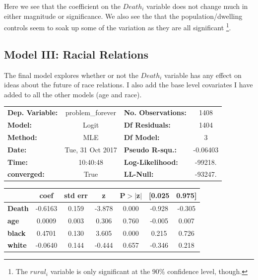 \documentclass{article}
\begin{document}
\bigskip

Here we see that the coefficient on the $Death_{i}$ variable does not change much in either magnitude or significance. We also see the that the population/dwelling controls seem to soak up some of the variation as they are all significant \footnote{The $rural_{i}$ variable is only significant at the $90\%$ confidence level, though.}. 

\subsection{Model III: Racial Relations}

The final model explores whether or not the $Death_{i}$ variable has any effect on ideas about the future of race relations. I also add the base level covariates I have added to all the other models (age and race).

\begin{tabular}{lclc}
\toprule
\textbf{Dep. Variable:} & problem\_forever  & \textbf{  No. Observations:  } &     1408    \\
\textbf{Model:}         &      Logit       & \textbf{  Df Residuals:      } &     1404    \\
\textbf{Method:}        &       MLE        & \textbf{  Df Model:          } &        3    \\
\textbf{Date:}          & Tue, 31 Oct 2017 & \textbf{  Pseudo R-squ.:     } &  -0.06403   \\
\textbf{Time:}          &     10:40:48     & \textbf{  Log-Likelihood:    } &   -99218.   \\
\textbf{converged:}     &       True       & \textbf{  LL-Null:           } &   -93247.   \\
\bottomrule
\end{tabular}
\begin{tabular}{lcccccc}
               & \textbf{coef} & \textbf{std err} & \textbf{z} & \textbf{P$>$$|$z$|$} & \textbf{[0.025} & \textbf{0.975]}  \\
\midrule
\textbf{Death} &      -0.6163  &        0.159     &    -3.878  &         0.000        &       -0.928    &       -0.305     \\
\textbf{age}   &       0.0009  &        0.003     &     0.306  &         0.760        &       -0.005    &        0.007     \\
\textbf{black} &       0.4701  &        0.130     &     3.605  &         0.000        &        0.215    &        0.726     \\
\textbf{white} &      -0.0640  &        0.144     &    -0.444  &         0.657        &       -0.346    &        0.218     \\
\bottomrule
\end{tabular}
\end{document}
